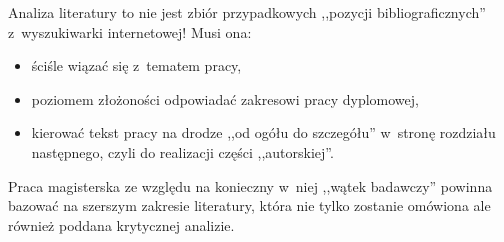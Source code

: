 Analiza literatury to nie jest zbiór przypadkowych ,,pozycji bibliograficznych'' z~wyszukiwarki internetowej! Musi ona:

\begin{itemize}
	\item ściśle wiązać się z~tematem pracy,
	\item poziomem złożoności odpowiadać zakresowi pracy dyplomowej, 
	\item kierować tekst pracy na drodze ,,od ogółu do szczegółu'' w~stronę rozdziału następnego, czyli do realizacji części ,,autorskiej''.
\end{itemize}

Praca magisterska ze względu na konieczny w~niej ,,wątek badawczy'' powinna bazować na szerszym zakresie literatury, która nie tylko zostanie omówiona ale również poddana krytycznej analizie.

